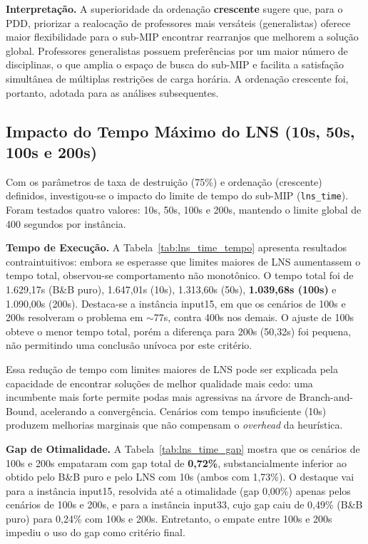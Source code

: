 



\textbf{Interpretação.} A superioridade da ordenação \textbf{crescente} sugere que, para o PDD, priorizar a realocação de professores mais versáteis (generalistas) oferece maior flexibilidade para o sub-MIP encontrar rearranjos que melhorem a solução global. Professores generalistas possuem preferências por um maior número de disciplinas, o que amplia o espaço de busca do sub-MIP e facilita a satisfação simultânea de múltiplas restrições de carga horária. A ordenação crescente foi, portanto, adotada para as análises subsequentes.

\subsection{Impacto do Tempo Máximo do LNS (10s, 50s, 100s e 200s)}

Com os parâmetros de taxa de destruição (75\%) e ordenação (crescente) definidos, investigou-se o impacto do limite de tempo do sub-MIP (\texttt{lns\_time}). Foram testados quatro valores: 10s, 50s, 100s e 200s, mantendo o limite global de 400 segundos por instância.

\textbf{Tempo de Execução.} A Tabela~\ref{tab:lns_time_tempo} apresenta resultados contraintuitivos: embora se esperasse que limites maiores de LNS aumentassem o tempo total, observou-se comportamento não monotônico. O tempo total foi de 1.629,17s (B\&B puro), 1.647,01s (10s), 1.313,60s (50s), \textbf{1.039,68s (100s)} e 1.090,00s (200s). Destaca-se a instância input15, em que os cenários de 100s e 200s resolveram o problema em $\sim$77s, contra 400s nos demais. O ajuste de 100s obteve o menor tempo total, porém a diferença para 200s (50,32s) foi pequena, não permitindo uma conclusão unívoca por este critério.



Essa redução de tempo com limites maiores de LNS pode ser explicada pela capacidade de encontrar soluções de melhor qualidade mais cedo: uma incumbente mais forte permite podas mais agressivas na árvore de Branch-and-Bound, acelerando a convergência. Cenários com tempo insuficiente (10s) produzem melhorias marginais que não compensam o \emph{overhead} da heurística.

\textbf{Gap de Otimalidade.} A Tabela~\ref{tab:lns_time_gap} mostra que os cenários de 100s e 200s empataram com gap total de \textbf{0,72\%}, substancialmente inferior ao obtido pelo B\&B puro e pelo LNS com 10s (ambos com 1,73\%). O destaque vai para a instância input15, resolvida até a otimalidade (gap 0,00\%) apenas pelos cenários de 100s e 200s, e para a instância input33, cujo gap caiu de 0,49\% (B\&B puro) para 0,24\% com 100s e 200s. Entretanto, o empate entre 100s e 200s impediu o uso do gap como critério final.

